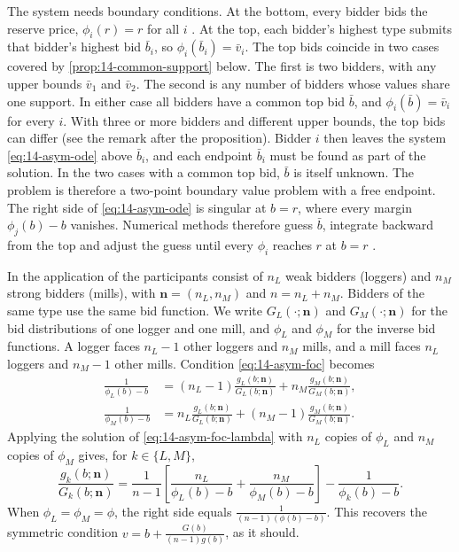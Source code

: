 The system needs boundary conditions. At the bottom, every bidder bids the reserve price,
$\phi_i(r)=r$ for all $i$ \citep[Section II.B]{AtheyLevinSeira2011}. At the top, each bidder's
highest type submits that bidder's highest bid $\bar b_i$, so $\phi_i(\bar b_i)=\bar v_i$. The top
bids coincide in two cases covered by \cref{prop:14-common-support} below. The first is two
bidders, with any upper bounds $\bar v_1$ and $\bar v_2$. The second is any number of bidders whose
values share one support. In either case all bidders have a common top bid $\bar b$, and
$\phi_i(\bar b)=\bar v_i$ for every $i$. With three or more bidders and different upper bounds, the
top bids can differ (see the remark after the proposition). Bidder $i$ then leaves the system
\eqref{eq:14-asym-ode} above $\bar b_i$, and each endpoint $\bar b_i$ must be found as part of the
solution. In the two cases with a common top bid, $\bar b$ is itself unknown. The problem is
therefore a two-point boundary value problem with a free endpoint. The right side of
\eqref{eq:14-asym-ode} is singular at $b=r$, where every margin $\phi_j(b)-b$ vanishes. Numerical
methods therefore guess $\bar b$, integrate backward from the top and adjust the guess until every
$\phi_i$ reaches $r$ at $b=r$ \citep{MarshallEtAl1994,Bajari2001}.

In the application of \citet{AtheyLevinSeira2011} the participants consist of $n_L$ weak bidders
(loggers) and $n_M$ strong bidders (mills), with $\bm n=(n_L,n_M)$ and $n=n_L+n_M$. Bidders of the
same type use the same bid function. We write $G_L(\cdot;\bm n)$ and $G_M(\cdot;\bm n)$ for the bid
distributions of one logger and one mill, and $\phi_L$ and $\phi_M$ for the inverse bid functions. A logger
faces $n_L-1$ other loggers and $n_M$ mills, and a mill faces $n_L$ loggers and $n_M-1$ other mills.
Condition \eqref{eq:14-asym-foc} becomes
\begin{align}
\frac{1}{\phi_L(b)-b}&=(n_L-1)\frac{g_L(b;\bm n)}{G_L(b;\bm n)}+n_M\frac{g_M(b;\bm n)}{G_M(b;\bm n)},\label{eq:14-ts-foc-L}\\
\frac{1}{\phi_M(b)-b}&=n_L\frac{g_L(b;\bm n)}{G_L(b;\bm n)}+(n_M-1)\frac{g_M(b;\bm n)}{G_M(b;\bm n)}.\label{eq:14-ts-foc-M}
\end{align}
Applying the solution of \eqref{eq:14-asym-foc-lambda} with $n_L$ copies of $\phi_L$ and $n_M$
copies of $\phi_M$ gives, for $k\in\{L,M\}$,
\begin{equation}\label{eq:14-ts-lambda}
\frac{g_k(b;\bm n)}{G_k(b;\bm n)}=\frac{1}{n-1}\left[\frac{n_L}{\phi_L(b)-b}+\frac{n_M}{\phi_M(b)-b}\right]-\frac{1}{\phi_k(b)-b}.
\end{equation}
When $\phi_L=\phi_M=\phi$, the right side equals $\frac{1}{(n-1)(\phi(b)-b)}$. This recovers the
symmetric condition $v=b+\frac{G(b)}{(n-1)g(b)}$, as it should.

